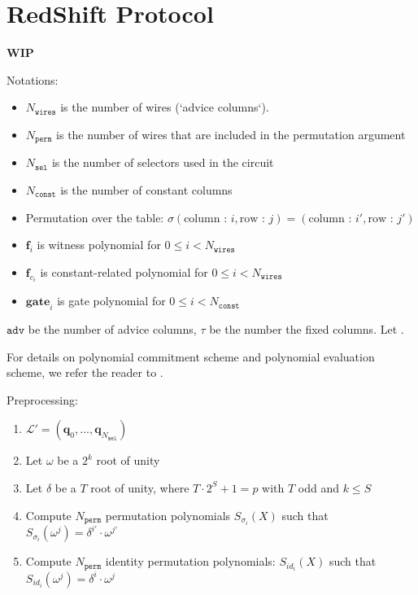 \section{RedShift Protocol}
\label{section:protocol}
\textbf{WIP}

Notations:
\begin{itemize}
	\item $N_{\texttt{wires}}$ is the number of wires (`advice columns`).
	\item $N_{\texttt{perm}}$ is the number of wires that are included in the permutation argument
	\item $N_{\texttt{sel}}$ is the number of selectors used in the circuit
	\item $N_{\texttt{const}}$ is the number of constant columns 
	\item Permutation over the table: $\sigma(\text{column : } i, \text{row : } j) = (\text{column : } i', \text{row : } j')$
	\item $\textbf{f}_i$ is witness polynomial for $0 \leq i < N_{\texttt{wires}}$
	\item $\textbf{f}_{c_i}$ is constant-related polynomial for $0 \leq i < N_{\texttt{wires}}$
	\item $\textbf{gate}_i$ is gate polynomial for $0 \leq i < N_{\texttt{const}}$
\end{itemize}

 $\texttt{adv}$ be the number of advice columns, $\tau$ be the number the fixed columns. 
Let . 

For details on polynomial commitment scheme and polynomial evaluation scheme, we refer the reader to \cite{cryptoeprint:2019:1400}.

Preprocessing:
\begin{enumerate}
	\item $\mathcal{L}' = (\textbf{q}_{0}, ..., \textbf{q}_{N_{\texttt{sel}}})$
	\item Let $\omega$ be a $2^k$ root of unity
	\item Let $\delta$ be a $T$ root of unity, where $T \cdot 2^S + 1 = p$ with $T$ odd and $k \leq S$
	\item Compute $N_{\texttt{perm}}$ permutation polynomials $S_{\sigma_i}(X)$ such that $S_{\sigma_i}(\omega^j) = \delta^{i'} \cdot \omega^{j'}$
	\item Compute $N_{\texttt{perm}}$ identity permutation polynomials: $S_{id_i}(X)$ such that $S_{id_i}(\omega^j) = \delta^i \cdot \omega^j$
\end{enumerate}

